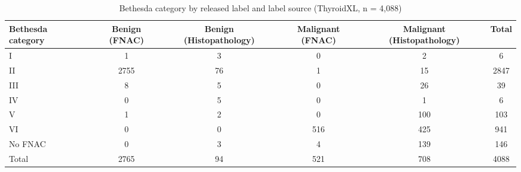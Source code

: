 \begin{table}[htbp]
\caption{Bethesda category by released label and label source (ThyroidXL, n = 4,088)}\label{tab:s1_label_provenance}
\scriptsize
\begin{tabular*}{\textwidth}{@{\extracolsep{\fill}}lccccc@{}}
\toprule
Bethesda category & Benign (FNAC) & Benign (Histopathology) & Malignant (FNAC) & Malignant (Histopathology) & Total \\
\midrule
I & 1 & 3 & 0 & 2 & 6 \\
II & 2755 & 76 & 1 & 15 & 2847 \\
III & 8 & 5 & 0 & 26 & 39 \\
IV & 0 & 5 & 0 & 1 & 6 \\
V & 1 & 2 & 0 & 100 & 103 \\
VI & 0 & 0 & 516 & 425 & 941 \\
No FNAC & 0 & 3 & 4 & 139 & 146 \\
Total & 2765 & 94 & 521 & 708 & 4088 \\
\bottomrule
\end{tabular*}
\end{table}
